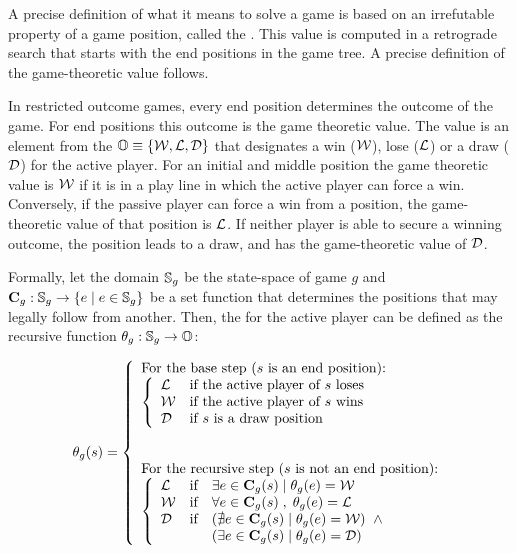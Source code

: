 A precise definition of what it means to solve a game is based on an irrefutable property of a game position, called the .  This value is computed in a retrograde search that starts with the end positions in the game tree. A precise definition of the game-theoretic value follows.  

In restricted outcome games, every end position determines the outcome of the game.  For end positions this outcome is the game theoretic value. The value is an element from the  $\mathbb{O} \equiv \{{\mathcal W},{\mathcal L},{\mathcal D}\}$ that designates a win (${\mathcal W}$), lose (${\mathcal L}$) or a draw (${\mathcal D}$) for the active player. For an initial and middle position the game theoretic value is ${\mathcal W}$ if it is in a play line in which the active player can force a win.  Conversely, if the passive player can force a win from a position, the game-theoretic value of that position is ${\mathcal L}$.  If neither player is able to secure a winning outcome, the position leads to a draw, and has the game-theoretic value of ${\mathcal D}$. 

Formally, let the domain $\mathbb{S}_g$ be the state-space of game $g$ and ${\bf C}_g:\mathbb{S}_g \rightarrow \{e \; | \; e \in \mathbb{S}_g\}$ be a set function that determines the positions that may legally follow from another.  Then, the  for the active player can be defined as the recursive function $\theta_g: \mathbb{S}_g \rightarrow \mathbb{O}$:

\begin{equation}
\label{eq:solve}
\theta_g(s)  =  \left\{
\begin{array}{l}
\mbox{For the base step ($s$ is an end position):}\\
	\left\{
	\begin{array} {ll}
		\mylose & $if the active player of $s$ loses$ \\
		\mywin &  $if the active player of $s$ wins$ \\
	    \mydraw & $if $s$ is a draw position$\\
	\end{array}		
	\right.
	\\
\\
\\
\mbox{For the recursive step ($s$ is not an end position):}\\
	\left\{
	\begin{array} {lcl}
		\mylose & $if$ & \exists e \in {\bf C}_g(s) \myst  \theta_g(e) = \mywin  \\
		\mywin & $if$ & \forall e \in {\bf C}_g(s) \;,\;  \theta_g(e) = \mylose  \\
	    \mydraw & $if$ &  (\nexists e \in 
	                      {\bf C}_g(s) \myst  \theta_g(e) = \mywin)\; \myand \\                         & &   
	                      (\exists 
	                      e \in {\bf C}_g(s) \myst  \theta_g(e) = \mydraw)
	\end{array}		
	\right.
\end{array}
\right.
\end{equation}

